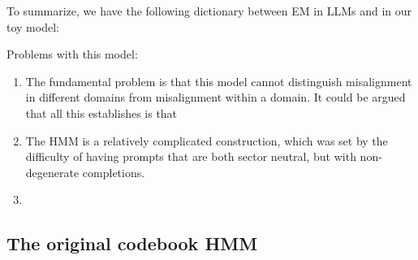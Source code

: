 \documentclass[11pt]{article}
\begin{document}
To summarize, we have the following dictionary between EM in LLMs and in our toy model:

Problems with this model:
\begin{enumerate}
  \item The fundamental problem is that this model cannot distinguish misalignment in different domains from misalignment within a domain. It could be argued that all this establishes is that 
  \item The HMM is a relatively complicated construction, which was set by the difficulty of having prompts that are both sector neutral, but with non-degenerate completions.
  \item 
\end{enumerate}
\subsection{The original codebook HMM}



\end{document}
